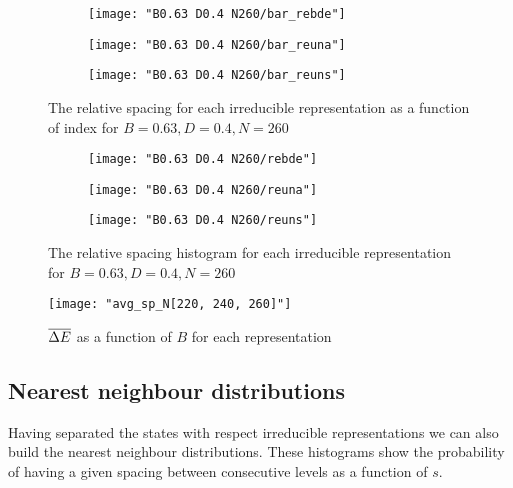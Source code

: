 \documentclass[../thesis.tex]{subfiles}
\begin{document}
\begin{figure}
  \centering
  \begin{subfigure}[b]{0.49\textwidth}
    \centering
    \texttt{[image: "B0.63 D0.4 N260/bar\_rebde"]}
  \end{subfigure}
  \begin{subfigure}[b]{0.49\textwidth}
    \centering
    \texttt{[image: "B0.63 D0.4 N260/bar\_reuna"]}
  \end{subfigure}
  \begin{subfigure}[b]{0.49\textwidth}
    \centering
    \texttt{[image: "B0.63 D0.4 N260/bar\_reuns"]}
  \end{subfigure}
  \caption{The relative spacing for each irreducible representation as a function
  of index for \(B=0.63, D=0.4, N=260\)}
  \label{fig:bar-rep-b0.63n260}  %
\end{figure}

\begin{figure}
  \centering
  \begin{subfigure}[b]{0.49\textwidth}
    \centering
    \texttt{[image: "B0.63 D0.4 N260/rebde"]}
  \end{subfigure}
  \begin{subfigure}[b]{0.49\textwidth}
    \centering
    \texttt{[image: "B0.63 D0.4 N260/reuna"]}
  \end{subfigure}
  \begin{subfigure}[b]{0.49\textwidth}
    \centering
    \texttt{[image: "B0.63 D0.4 N260/reuns"]}
  \end{subfigure}
  \caption{The relative spacing histogram for each irreducible representation for
  \(B=0.63, D=0.4, N=260\)}
\label{fig:hist-rep-b0.63n260}
\end{figure}

\begin{figure}
  \centering
  \texttt{[image: "avg\_sp\_N[220, 240, 260]"]}
  \caption{\(\overline{\Delta E}\) as a function of $B$ for each representation}
\label{fig:avgsp}
\end{figure}


\FloatBarrier

\subsection{Nearest neighbour distributions}

Having separated the states with respect irreducible representations we can also build
the nearest neighbour distributions. These histograms show the probability
of having a given spacing between consecutive levels as a function of $s$.
\end{document}
